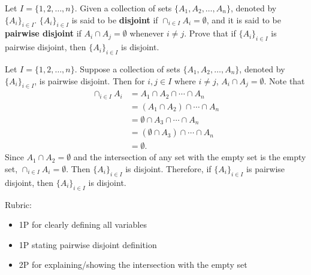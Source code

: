 \documentclass{article}
\theoremstyle{definition}
\begin{document}
\begin{question}{4}
   Let $I=\{1, 2, \dots, n\}$. Given a collection of sets $\{A_1,A_2,\dots, A_n\}$, denoted by $\{A_i\}_{i\in I}$. $\{A_i\}_{i\in I}$ is said to be \textbf{disjoint} if $\cap_{i\in I}A_i=\emptyset$, and it is said to be \textbf{pairwise disjoint} if $A_i\cap A_j=\emptyset$ whenever $i\neq j$. Prove that if $\{A_i\}_{i\in I}$ is pairwise disjoint, then $\{A_i\}_{i\in I}$ is disjoint.
\end{question}
\begin{solution}
 Let $I=\{1, 2, \dots, n\}$. Suppose a collection of sets $\{A_1,A_2,\dots, A_n\}$, denoted by $\{A_i\}_{i\in I}$, is pairwise disjoint. Then for $i, j\in I$ where $i\neq j$, $A_i\cap A_j=\emptyset$. Note that 
 \begin{align*}
 \cap_{i\in I}A_i &= A_1 \cap A_2 \cap \cdots\cap A_n\\
 &= (A_1 \cap A_2) \cap \cdots\cap A_n\\
 &= \emptyset \cap A_3\cap \cdots\cap A_n\\
 &= (\emptyset \cap A_3)\cap \cdots\cap A_n\\
 & = \emptyset.
 \end{align*}
Since $A_1 \cap A_2 = \emptyset$ and the intersection of any set with the empty set is the empty set, $ \cap_{i\in I}A_i = \emptyset$. Then $\{A_i\}_{i\in I}$ is disjoint. Therefore, if $\{A_i\}_{i\in I}$ is pairwise disjoint, then $\{A_i\}_{i\in I}$ is disjoint.

{\color{red} Rubric:
\begin{itemize}
\item 1P for clearly defining all variables
\item 1P stating pairwise disjoint definition
\item 2P for explaining/showing the intersection with the empty set
\end{itemize}}
\end{solution}
\end{document}
